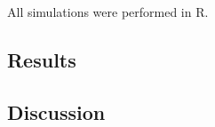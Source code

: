 \documentclass[a4paper,11pt]{article}
\begin{document}
All simulations were performed in R. 

\subsection*{Results}

\subsection*{Discussion}




\end{document}
